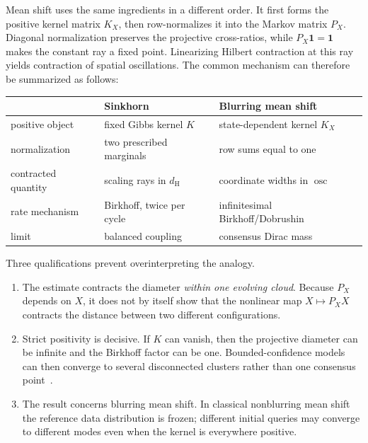 \documentclass[11pt]{article}
\theoremstyle{definition}
\newcommand{\one}{\mathbf{1}}
\newcommand{\osc}{\operatorname{osc}}
\newcommand{\dH}{d_{\mathrm H}}
\begin{document}
Mean shift uses the same ingredients in a different order.  It first forms the
positive kernel matrix $K_X$, then row-normalizes it into the Markov matrix
$P_X$.  Diagonal normalization preserves the projective cross-ratios, while
$P_X\one=\one$ makes the constant ray a fixed point.  Linearizing Hilbert
contraction at this ray yields contraction of spatial oscillations.  The common
mechanism can therefore be summarized as follows:

\begin{center}
\begin{tabular}{@{}lll@{}}
\toprule
 & Sinkhorn & Blurring mean shift \\
\midrule
positive object & fixed Gibbs kernel $K$ & state-dependent kernel $K_X$ \\
normalization & two prescribed marginals & row sums equal to one \\
contracted quantity & scaling rays in $\dH$ & coordinate widths in $\osc$ \\
rate mechanism & Birkhoff, twice per cycle & infinitesimal Birkhoff/Dobrushin \\
limit & balanced coupling & consensus Dirac mass \\
\bottomrule
\end{tabular}
\end{center}

Three qualifications prevent overinterpreting the analogy.

\begin{enumerate}
\item The estimate contracts the diameter \emph{within one evolving cloud}.
Because $P_X$ depends on $X$, it does not by itself show that the nonlinear map
$X\mapsto P_XX$ contracts the distance between two different configurations.

\item Strict positivity is decisive.  If $K$ can vanish, then the projective
diameter can be infinite and the Birkhoff factor can be one.  Bounded-confidence
models can then converge to several disconnected clusters rather than one
consensus point~\cite{HegselmannKrause2002}.

\item The result concerns blurring mean shift.  In classical nonblurring mean
shift the reference data distribution is frozen; different initial queries may
converge to different modes even when the kernel is everywhere positive.
\end{enumerate}
\end{document}
